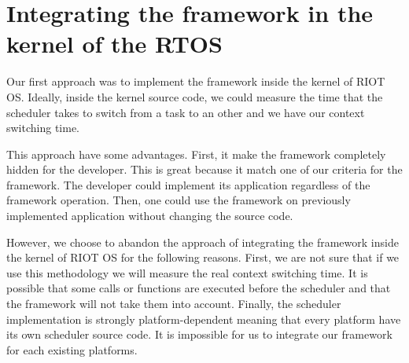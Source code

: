 \section{Integrating the framework in the kernel of the RTOS \label{sec:kernel}}

Our first approach was to implement the framework inside the kernel of RIOT OS.
Ideally, inside the kernel source code, we could measure the time that the scheduler takes to switch from a task to an other and we have our context switching time.

This approach have some advantages.
First, it make the framework completely hidden for the developer.
This is great because it match one of our criteria for the framework.
The developer could implement its application regardless of the framework operation.
Then, one could use the framework on previously implemented application without changing the source code.

However, we choose to abandon the approach of integrating the framework inside the kernel of RIOT OS for the following reasons.
First, we are not sure that if we use this methodology we will measure the real context switching time.
It is possible that some calls or functions are executed before the scheduler and that the framework will not take them into account.
Finally, the scheduler implementation is strongly platform-dependent meaning that every platform have its own scheduler source code.
It is impossible for us to integrate our framework for each existing platforms.